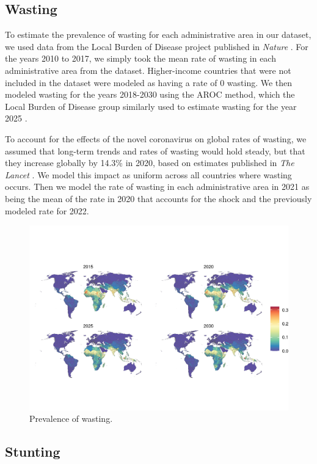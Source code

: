 \documentclass{article}
\begin{document}
\subsection{Wasting}
To estimate the prevalence of wasting for each administrative area in our dataset, we used data from the Local Burden of Disease project published in \textit{Nature} \citep{Local2020}.  For the years 2010 to 2017, we simply took the mean rate of wasting in each administrative area from the dataset.  Higher-income countries that were not included in the dataset were modeled as having a rate of 0 wasting.  We then modeled wasting for the years 2018-2030 using the AROC method, which the Local Burden of Disease group similarly used to estimate wasting for the year 2025 \citep{Local2020}.

To account for the effects of the novel coronavirus on global rates of wasting, we assumed that long-term trends and rates of wasting would hold steady, but that they increase globally by 14.3\% in 2020, based on estimates published in \textit{The Lancet} \citep{headey2020impacts}.  We model this impact as uniform across all countries where wasting occurs.  Then we model the rate of wasting in each administrative area in 2021 as being the mean of the rate in 2020 that accounts for the shock and the previously modeled rate for 2022.

\begin{figure}[H]
  \centering
  \includegraphics[width=\linewidth]{img/covars/wasting.png}
  \caption{Prevalence of wasting.}
\end{figure}

\subsection{Stunting}
\end{document}
